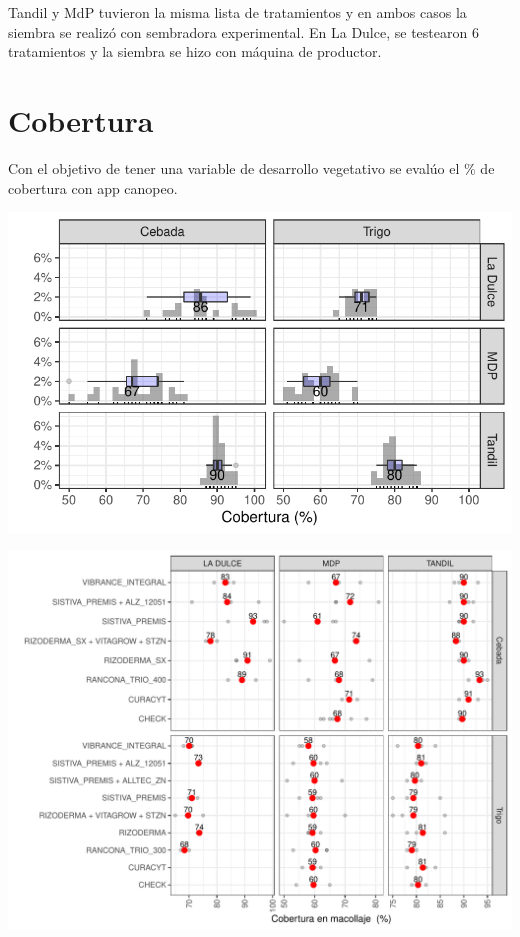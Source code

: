 \documentclass[
  letterpaper,
  DIV=11,
  numbers=noendperiod]{scrreprt}
\begin{document}
Tandil y MdP tuvieron la misma lista de tratamientos y en ambos casos la
siembra se realizó con sembradora experimental. En La Dulce, se
testearon 6 tratamientos y la siembra se hizo con máquina de productor.

\hypertarget{cobertura}{%
\section{Cobertura}\label{cobertura}}

Con el objetivo de tener una variable de desarrollo vegetativo se evalúo
el \% de cobertura con app canopeo.

\includegraphics{./cura_files/figure-pdf/unnamed-chunk-12-1.pdf}

\includegraphics{./cura_files/figure-pdf/cober_plot-1.pdf}
\end{document}
